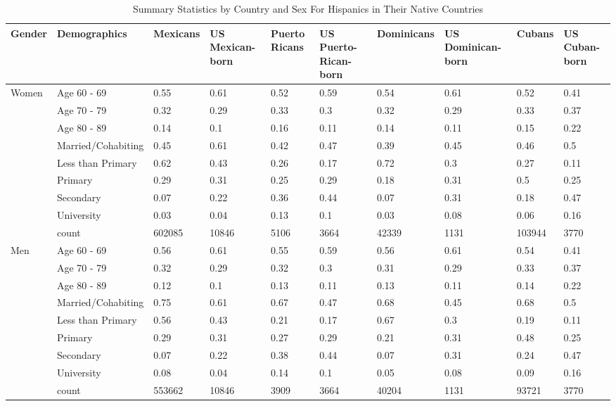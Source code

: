 \begin{table}[ht]
\centering
\caption{Summary Statistics by Country and Sex For Hispanics in Their Native Countries} 
\begin{tabular}{l|l|llllllll}
  \hline
Gender & Demographics & Mexicans & US Mexican-born & Puerto Ricans & US Puerto-Rican-born & Dominicans & US Dominican-born & Cubans & US Cuban-born \\ 
  \hline
Women & Age 60 - 69 & 0.55 & 0.61 & 0.52 & 0.59 & 0.54 & 0.61 & 0.52 & 0.41 \\ 
   & Age 70 - 79 & 0.32 & 0.29 & 0.33 & 0.3 & 0.32 & 0.29 & 0.33 & 0.37 \\ 
   & Age 80 - 89 & 0.14 & 0.1 & 0.16 & 0.11 & 0.14 & 0.11 & 0.15 & 0.22 \\ 
   & Married/Cohabiting & 0.45 & 0.61 & 0.42 & 0.47 & 0.39 & 0.45 & 0.46 & 0.5 \\ 
   & Less than Primary & 0.62 & 0.43 & 0.26 & 0.17 & 0.72 & 0.3 & 0.27 & 0.11 \\ 
   & Primary & 0.29 & 0.31 & 0.25 & 0.29 & 0.18 & 0.31 & 0.5 & 0.25 \\ 
   & Secondary & 0.07 & 0.22 & 0.36 & 0.44 & 0.07 & 0.31 & 0.18 & 0.47 \\ 
   & University & 0.03 & 0.04 & 0.13 & 0.1 & 0.03 & 0.08 & 0.06 & 0.16 \\ 
   & count & 602085 & 10846 & 5106 & 3664 & 42339 & 1131 & 103944 & 3770 \\ 
  Men & Age 60 - 69 & 0.56 & 0.61 & 0.55 & 0.59 & 0.56 & 0.61 & 0.54 & 0.41 \\ 
   & Age 70 - 79 & 0.32 & 0.29 & 0.32 & 0.3 & 0.31 & 0.29 & 0.33 & 0.37 \\ 
   & Age 80 - 89 & 0.12 & 0.1 & 0.13 & 0.11 & 0.13 & 0.11 & 0.14 & 0.22 \\ 
   & Married/Cohabiting & 0.75 & 0.61 & 0.67 & 0.47 & 0.68 & 0.45 & 0.68 & 0.5 \\ 
   & Less than Primary & 0.56 & 0.43 & 0.21 & 0.17 & 0.67 & 0.3 & 0.19 & 0.11 \\ 
   & Primary & 0.29 & 0.31 & 0.27 & 0.29 & 0.21 & 0.31 & 0.48 & 0.25 \\ 
   & Secondary & 0.07 & 0.22 & 0.38 & 0.44 & 0.07 & 0.31 & 0.24 & 0.47 \\ 
   & University & 0.08 & 0.04 & 0.14 & 0.1 & 0.05 & 0.08 & 0.09 & 0.16 \\ 
   & count & 553662 & 10846 & 3909 & 3664 & 40204 & 1131 & 93721 & 3770 \\ 
   \hline
\end{tabular}
\end{table}
